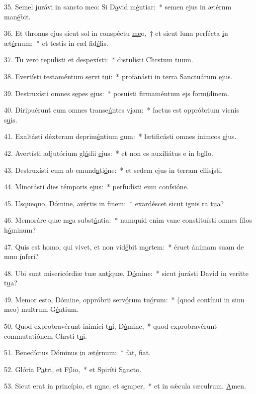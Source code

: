 35. Semel jurávi in sancto meo: Si D\uline{a}vid m\uline{é}ntiar:~* semen ejus in ætérnm man\uline{é}bit.\par 
36. Et thronus ejus sicut sol in conspéctu \uline{me}o,~† et sicut luna perfécta \uline{i}n æt\uline{é}rnum:~* et testis in cæl fid\uline{é}lis.\par 
37. Tu vero repulísti et d\uline{e}spex\uline{í}sti:~* distulísti Chrstum t\uline{u}um.\par 
38. Evertísti testaméntum s\uline{e}rvi t\uline{u}i:~* profanásti in terra Sanctuárum \uline{e}jus.\par 
39. Destruxísti omnes s\uline{e}pes \uline{e}jus:~* posuísti firmaméntum ejs form\uline{í}dinem.\par 
40. Diripuérunt eum omnes transe\uline{ú}ntes v\uline{i}am:~* factus est oppróbrium vicnis s\uline{u}is.\par 
41. Exaltásti déxteram deprim\uline{é}ntium \uline{e}um:~* lætificásti omnes inimcos \uline{e}jus.\par 
42. Avertísti adjutórium gl\uline{á}dii \uline{e}jus:~* et non es auxiliátus e in b\uline{e}llo.\par 
43. Destruxísti eum ab emund\uline{a}ti\uline{ó}ne:~* et sedem ejus in terram cllis\uline{í}sti.\par 
44. Minorásti dies t\uline{é}mporis \uline{e}jus:~* perfudísti eum confsi\uline{ó}ne.\par 
45. Usquequo, Dómine, av\uline{é}rtis in f\uline{i}nem:~* exardéscet sicut ignis ra t\uline{u}a?\par 
46. Memoráre quæ m\uline{e}a subst\uline{á}ntia:~* numquid enim vane constituísti omnes fílos h\uline{ó}minum?\par 
47. Quis est homo, qui vivet, et non vid\uline{é}bit m\uline{o}rtem:~* éruet ánimam suam de mnu \uline{í}nferi?\par 
48. Ubi sunt misericórdiæ tuæ ant\uline{í}quæ, D\uline{ó}mine:~* sicut jurásti David in veritte t\uline{u}a?\par 
49. Memor esto, Dómine, oppróbrii serv\uline{ó}rum tu\uline{ó}rum:~* (quod contínui in sinu meo) multrum G\uline{é}ntium.\par 
50. Quod exprobravérunt inimíci t\uline{u}i, D\uline{ó}mine,~* quod exprobravérunt commutatiónem Chrsti t\uline{u}i.\par 
51. Benedíctus Dóminus \uline{i}n æt\uline{é}rnum:~* fat, f\uline{i}at.\par 
52. Glória P\uline{a}tri, et F\uline{í}lio,~* et Spiríti S\uline{a}ncto.\par 
53. Sicut erat in princípio, et n\uline{u}nc, et s\uline{e}mper,~* et in sǽcula sæculrum. \uline{A}men.\par 
